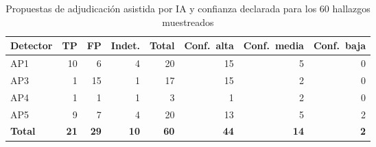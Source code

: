 \begin{table}[t]
\centering
\footnotesize
\setlength{\tabcolsep}{6pt}
\caption{Propuestas de adjudicación asistida por IA y confianza declarada para los 60 hallazgos muestreados}
\label{tab:adjudicacion}
\begin{tabularx}{\textwidth}{@{}X r r r r r r r@{}}
\toprule
\textbf{Detector} & \textbf{TP} & \textbf{FP} & \textbf{Indet.} & \textbf{Total} & \textbf{Conf.\ alta} & \textbf{Conf.\ media} & \textbf{Conf.\ baja} \\
\midrule
AP1 & 10 & 6 & 4 & 20 & 15 & 5 & 0 \\
AP3 & 1 & 15 & 1 & 17 & 15 & 2 & 0 \\
AP4 & 1 & 1 & 1 & 3 & 1 & 2 & 0 \\
AP5 & 9 & 7 & 4 & 20 & 13 & 5 & 2 \\
\midrule
\textbf{Total} & \textbf{21} & \textbf{29} & \textbf{10} & \textbf{60} & \textbf{44} & \textbf{14} & \textbf{2} \\
\bottomrule
\end{tabularx}
\end{table}